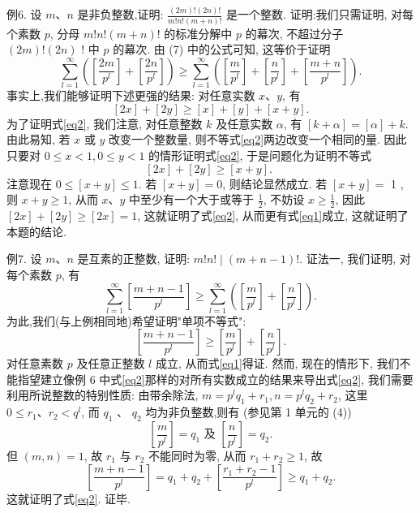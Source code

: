 例6. 设 $m 、 n$ 是非负整数,证明: $\frac{(2 m) !(2 n) !}{m ! n !(m+n) !}$ 是一个整数.
证明:我们只需证明, 对每个素数 $p$, 分母 $m ! n !(m+n) !$ 的标准分解中 $p$ 的幕次, 不超过分子 $(2 m) !(2 n)$ ! 中 $p$ 的幕次.
由 (7) 中的公式可知, 这等价于证明
$$
\sum_{l=1}^{\infty}\left(\left[\frac{2 m}{p^l}\right]+\left[\frac{2 n}{p^l}\right]\right) \geqslant \sum_{l=1}^{\infty}\left(\left[\frac{m}{p^l}\right]+\left[\frac{n}{p^l}\right]+\left[\frac{m+n}{p^l}\right]\right) . \label{eq1}
$$
事实上,我们能够证明下述更强的结果:
对任意实数 $x 、 y$, 有
$$
[2 x]+[2 y] \geqslant[x]+[y]+[x+y] . \label{eq2}
$$
为了证明式\ref{eq2}, 我们注意, 对任意整数 $k$ 及任意实数 $\alpha$, 有 $[k+\alpha]=[\alpha]+k$. 由此易知, 若 $x$ 或 $y$ 改变一个整数量, 则不等式\ref{eq2}两边改变一个相同的量.
因此只要对 $0 \leqslant x<1,0 \leqslant y<1$ 的情形证明式\ref{eq2}, 于是问题化为证明不等式
$$
[2 x]+[2 y] \geqslant[x+y] \text {. }
$$
注意现在 $0 \leqslant[x+y] \leqslant 1$. 若 $[x+y]=0$, 则结论显然成立.
若 $[x+y]=$ 1 , 则 $x+y \geqslant 1$, 从而 $x 、 y$ 中至少有一个大于或等于 $\frac{1}{2}$, 不妨设 $x \geqslant \frac{1}{2}$, 因此
$[2 x]+[2 y] \geqslant[2 x]=1$, 这就证明了式\ref{eq2}, 从而更有式\ref{eq1}成立, 这就证明了本题的结论.



例7. 设 $m 、 n$ 是互素的正整数, 证明: $m ! n ! \mid(m+n-1) !$.
证法一, 我们证明, 对每个素数 $p$, 有
$$
\sum_{l=1}^{\infty}\left[\frac{m+n-1}{p^l}\right] \geqslant \sum_{l=1}^{\infty}\left(\left[\frac{m}{p^l}\right]+\left[\frac{n}{p^l}\right]\right) . \label{eq1}
$$
为此,我们(与上例相同地)希望证明"单项不等式":
$$
\left[\frac{m+n-1}{p^l}\right] \geqslant\left[\frac{m}{p^l}\right]+\left[\frac{n}{p^l}\right]. \label{eq2}
$$
对任意素数 $p$ 及任意正整数 $l$ 成立, 从而式\ref{eq1}得证.
然而, 现在的情形下, 我们不能指望建立像例 6 中式\ref{eq2}那样的对所有实数成立的结果来导出式\ref{eq2}, 我们需要利用所说整数的特别性质:
由带余除法, $m=p^l q_1+r_1, n=p^l q_2+r_2$, 这里 $0 \leqslant r_1 、 r_2<q^l$, 而 $q_1$ 、 $q_2$ 均为非负整数,则有 (参见第 1 单元的 (4))
$$
\left[\frac{m}{p^l}\right]=q_1 \text { 及 }\left[\frac{n}{p^l}\right]=q_2 .
$$
但 $(m, n)=1$, 故 $r_1$ 与 $r_2$ 不能同时为零, 从而 $r_1+r_2 \geqslant 1$, 故
$$
\left[\frac{m+n-1}{p^l}\right]=q_1+q_2+\left[\frac{r_1+r_2-1}{p^l}\right] \geqslant q_1+q_2 .
$$
这就证明了式\ref{eq2}. 证毕.



